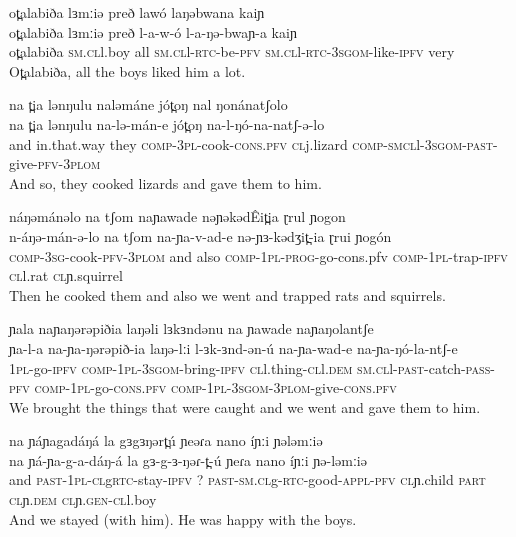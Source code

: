 		\ex  	  ot̪alabiða lɜmːiə preð lawó laŋəbwana kaiɲ	 \\	
		\gll  ot̪alabiða lɜmːiə preð l-a-w-ó l-a-ŋə-bwaɲ-a kaiɲ\\	
		 ot̪alabiða \textsc{sm.cl}l.boy all \textsc{sm.cl}l-\textsc{rtc}-be-\textsc{pfv} \textsc{sm.cl}l-\textsc{rtc-3sgom}-like-\textsc{ipfv} very\\
		\glt Ot̪alabiða, all the boys liked him a lot. 
		
		\ex  	  na t̪ia lənŋulu naləmáne jót̪oŋ nal ŋonánatʃolo	 \\	
		\gll na t̪ia lənŋulu na-lə-mán-e jót̪oŋ na-l-ŋó-na-natʃ-ə-lo	\\	
		 and in.that.way they \textsc{comp-3pl}-cook-\textsc{cons.pfv} \textsc{cl}j.lizard \textsc{comp-smcl}l-\textsc{3sgom-past}-give-\textsc{pfv-3plom} \\
		\glt And so, they cooked lizards and gave them to him. 
		
		\ex  	  náŋəmánəlo na tʃom naɲawade nəɲəkədÊit̪ia ɽrul ɲogon	 \\	
		\gll n-áŋə-mán-ə-lo na tʃom na-ɲa-v-ad-e nə-ɲɜ-kədʒit̪-ia ɽrui ɲogón\\	
		 \textsc{comp-3sg}-cook-\textsc{pfv-3plom} and also \textsc{comp-1pl-prog}-go-{cons.pfv} \textsc{comp-1pl}-trap-\textsc{ipfv} \textsc{cl}l.rat \textsc{cl}ɲ.squirrel \\
		\glt Then he cooked them and also we went and trapped rats and squirrels.  
		
	\ex  	  ɲala naɲaŋərəpiðia laŋəli lɜkɜndənu na ɲawade naɲaŋolantʃe	 \\	
		\gll  ɲa-l-a na-ɲa-ŋərəpið-ia laŋə-lːi l-ɜk-ɜnd-ən-ú na-ɲa-wad-e na-ɲa-ŋó-la-ntʃ-e\\	
		 \textsc{1pl}-go-\textsc{ipfv} \textsc{comp-1pl-3sgom}-bring-\textsc{ipfv} \textsc{cl}l.thing-\textsc{cl}l.\textsc{dem} \textsc{sm.cl}l-\textsc{past}-catch-\textsc{pass-pfv} \textsc{comp-1pl}-go-\textsc{cons.pfv} \textsc{comp-1pl-3sgom-3plom}-give-\textsc{cons.pfv}\\
		\glt We brought the things that were caught and we went and gave them to him.  
		
		
		
	\ex  	  na ɲáɲagadáŋá la gɜgɜŋərt̪ú ɲeəɾa nano íɲːi ɲələmːiə	 \\	
		\gll  na ɲá-ɲa-g-a-dáŋ-á la gɜ-g-ɜ-ŋəɾ-t̪-ú ɲeɾa nano íɲːi ɲə-ləmːiə \\	
		 and \textsc{past-1pl-cl}g\textsc{rtc}-stay-\textsc{ipfv} ? \textsc{past-sm.cl}g-\textsc{rtc}-good-\textsc{appl-pfv} \textsc{cl}ɲ.child \textsc{part} \textsc{cl}ɲ.\textsc{dem} \textsc{cl}ɲ.\textsc{gen-cl}l.boy\\
		\glt And we stayed (with him). He was happy with the boys. 

